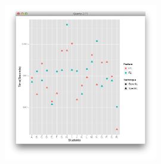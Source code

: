 \begin{figure}[t]
    \centering
    \includegraphics[width=0.6\textwidth]{images/dotplot.png}
    \caption{}
    \label{fig:dotplot}
\end{figure}